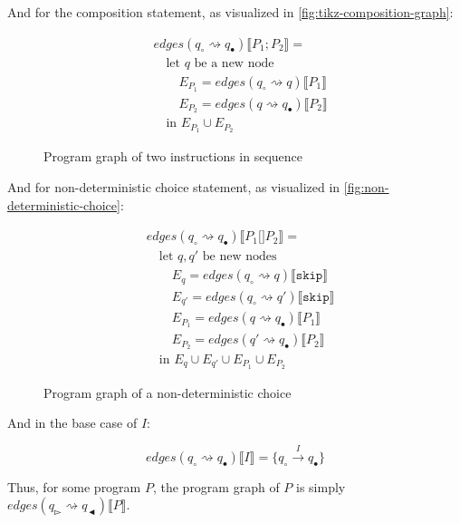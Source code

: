 And for the composition statement, as visualized in \autoref{fig:tikz-composition-graph}:

\begin{equation}
    \begin{split}
        &edges(q_\circ \rightsquigarrow q_\bullet) \lBrack P_1; P_2 \rBrack = \\
        &\quad \text{let } q \text{ be a new node} \\
        &\quad\quad E_{P_1} = edges(q_\circ \rightsquigarrow q) \lBrack P_1 \rBrack \\
        &\quad\quad E_{P_2} = edges(q \rightsquigarrow q_\bullet) \lBrack P_2 \rBrack \\
        &\quad \text{in } E_{P_1} \cup E_{P_2}
    \end{split}\label{eq:equation10}
\end{equation}


\begin{figure}
    \center
    
    \caption{Program graph of two instructions in sequence}
    \label{fig:tikz-composition-graph}
\end{figure}


And for non-deterministic choice statement, as visualized in \autoref{fig:non-deterministic-choice}:


\begin{equation}
    \begin{split}
        &edges(q_\circ \rightsquigarrow q_\bullet) \lBrack P_1 \texttt{[]} P_2 \rBrack = \\
        &\quad \text{let } q, q' \text{ be new nodes} \\
        &\quad\quad E_{q} = edges(q_\circ \rightsquigarrow q) \lBrack \texttt{skip} \rBrack \\
        &\quad\quad E_{q'} = edges(q_\circ \rightsquigarrow q') \lBrack \texttt{skip} \rBrack \\
        &\quad\quad E_{P_1}= edges(q \rightsquigarrow q_\bullet) \lBrack P_1 \rBrack \\
        &\quad\quad E_{P_2}= edges(q' \rightsquigarrow q_\bullet) \lBrack P_2 \rBrack \\
        &\quad \text{in } E_{q} \cup E_{q'} \cup E_{P_1} \cup E_{P_2}
    \end{split}\label{eq:equation13}
\end{equation}

\begin{figure}[htb!]
    \center
    
    \caption{Program graph of a non-deterministic choice}
    \label{fig:non-deterministic-choice}
\end{figure}

And in the base case of $I$:

\begin{equation*}
    edges(q_\circ \rightsquigarrow q_\bullet) \lBrack I \rBrack = \{q_\circ \xrightarrow{I} q_\bullet\}\label{eq:equation11}
\end{equation*}

Thus, for some program $P$, the program graph of $P$ is simply $edges(q_\whitepointerright \rightsquigarrow q_\blackpointerleft)\lBrack P \rBrack$.
